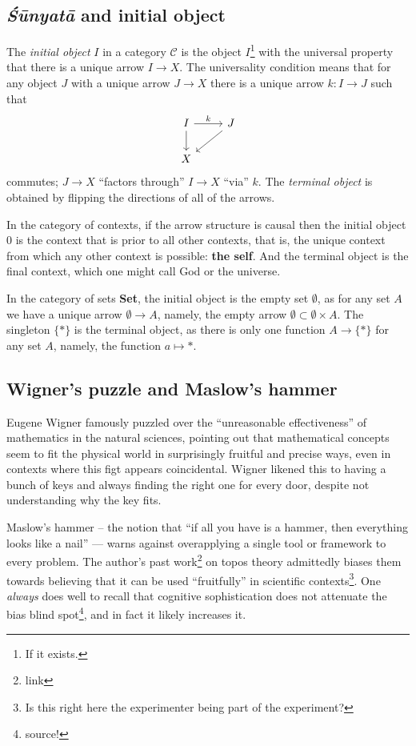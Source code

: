 \documentclass{article}
\begin{document}
\subsection{\emph{Śūnyatā} and initial object}
The \emph{initial object} $I$ in a category $\mathcal{C}$ is the object $I$\footnote{If it exists.} with the universal property that there is a unique arrow $I \to X$. The universality condition means that for any object $J$ with a unique arrow $J \to X$ there is a unique arrow $k \colon I \to J$ such that
\[
    \begin{tikzcd}
        I \arrow[r, "k"] \arrow[d] & J \arrow[ld] \\
        X
    \end{tikzcd}
\]
commutes; $J \to X$ ``factors through'' $I \to X$ ``via'' $k$. The \emph{terminal object} is obtained by flipping the directions of all of the arrows.

In the category of contexts, if the arrow structure is causal then the initial object $0$ is the context that is prior to all other contexts, that is, the unique context from which any other context is possible: \textbf{the self}. And the terminal object is the final context, which one might call God or the universe.

In the category of sets \textbf{Set}, the initial object is the empty set $\emptyset$, as for any set $A$ we have a unique arrow $\emptyset \to A$, namely, the empty arrow $\emptyset \subset \emptyset \times A$. The singleton $\{ * \}$ is the terminal object, as there is only one function $A \to \{ * \}$ for any set $A$, namely, the function $a \mapsto *$.

\subsection{Wigner's puzzle and Maslow's hammer}
Eugene Wigner famously puzzled over the ``unreasonable effectiveness'' of mathematics in the natural sciences, pointing out that mathematical concepts seem to fit the physical world in surprisingly fruitful and precise ways, even in contexts where this figt appears coincidental. Wigner likened this to having a bunch of keys and always finding the right one for every door, despite not understanding why the key fits.

Maslow's hammer -- the notion that ``if all you have is a hammer, then everything looks like a nail'' --- warns against overapplying a single tool or framework to every problem. The author's past work\footnote{link} on topos theory admittedly biases them towards believing that it can be used ``fruitfully'' in scientific contexts\footnote{Is this right here the experimenter being part of the experiment?}. One \emph{always} does well to recall that cognitive sophistication does not attenuate the bias blind spot\footnote{source!}, and in fact it likely increases it.
\end{document}
